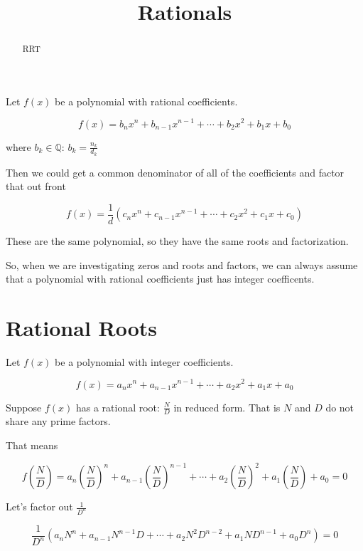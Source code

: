 \documentclass{ximera}
\title{Rationals}
\begin{document}
\begin{abstract}
RRT
\end{abstract}
\maketitle




Let $f(x)$ be a polynomial with rational coefficients.

\[   f(x) = b_n x^n + b_{n-1} x^{n-1} + \cdots + b_2 x^2 + b_1 x + b_0     \]


where $b_k \in \mathbb{Q}$:  $b_k = \frac{n_k}{d_k}$


Then we could get a common denominator of all of the coefficients and factor that out front



\[   f(x) = \frac{1}{d}(c_n x^n + c_{n-1} x^{n-1} + \cdots + c_2 x^2 + c_1 x + c_0)    \]


These are the same polynomial, so they have the same roots and factorization.


So, when we are investigating zeros and roots and factors, we can always assume that a polynomial with rational coefficients just has integer coefficents.




\section{Rational Roots}

Let $f(x)$ be a polynomial with integer coefficients.

\[   f(x) = a_n x^n + a_{n-1} x^{n-1} + \cdots + a_2 x^2 + a_1 x + a_0     \]


Suppose $f(x)$ has a rational root:  $\frac{N}{D}$ in reduced form.  That is $N$ and $D$ do not share any prime factors.



That means


\[    f \left( \frac{N}{D} \right) = a_n \left( \frac{N}{D} \right)^n + a_{n-1} \left( \frac{N}{D} \right)^{n-1} + \cdots + a_2 \left( \frac{N}{D} \right)^2 + a_1 \left( \frac{N}{D} \right) + a_0  = 0       \]


Let's factor out $\frac{1}{D^n}$





\[   \frac{1}{D^n} (a_n N^n + a_{n-1} N^{n-1} D + \cdots + a_2 N^2 D^{n-2}+ a_1 N D^{n-1} + a_0 D^n)  = 0       \]
\end{document}
